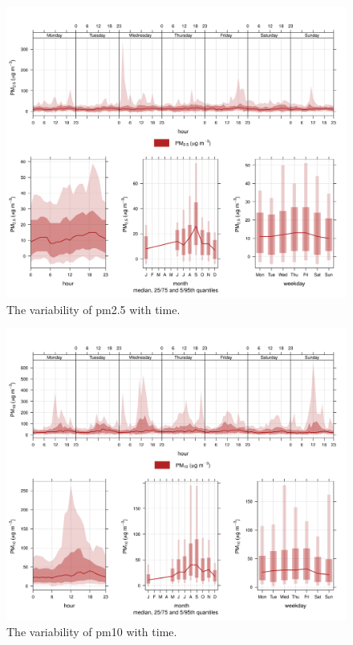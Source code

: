 \documentclass{nwureport}
\begin{document}
\begin{figure}[!htb]
    \centering
    \includegraphics[width=\textwidth]{images/Wedela_PM2-5_timevary.png}
    \caption[The variability of $PM_{2.5}$ with time.]{The variability of \gls{pm2.5} with time.}
    \label{fig:time-pm2.5}
\end{figure}

\begin{figure}[!htb]
    \centering
    \includegraphics[width=\textwidth]{images/Wedela_PM10_timevary.png}
    \caption[The variability of $PM_{10}$ with time.]{The variability of \gls{pm10} with time.}
    \label{fig:time-pm10}
\end{figure}
\end{document}
